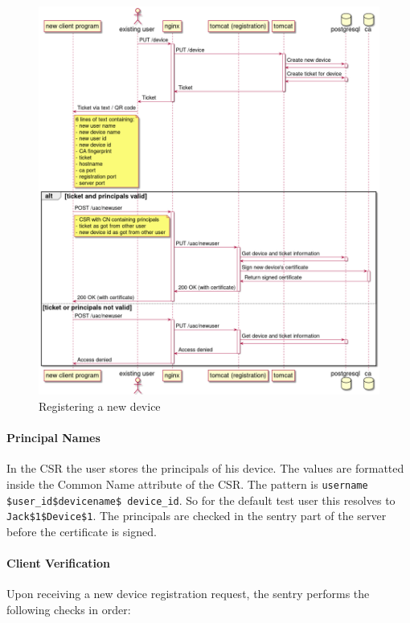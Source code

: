 \documentclass{memoir}
\begin{document}
\begin{figure}[!ht]
\includegraphics[width=\linewidth]{diagrams/device-registration.png}
\caption{Registering a new device}
\end{figure}

\paragraph{Principal Names}

In the CSR the user stores the principals of his device. The values are
formatted inside the Common Name attribute of the CSR. The pattern is
\texttt{username \$user\_id\$devicename\$ device\_id}. So for the default test
user this resolves to \texttt{Jack\$1\$Device\$1}. The principals are checked in
the sentry part of the server before the certificate is signed.

\paragraph{Client Verification}

Upon receiving a new device registration request, the sentry performs the
following checks in order:
\end{document}
